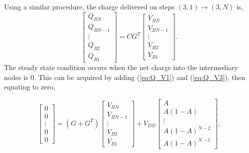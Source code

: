 \documentclass[conference]{IEEEtran}
\begin{document}
	Using a similar procedure, the charge delivered on steps $(3,1)\rightarrow(3,N)$ is,
	\begin{equation}
	\begin{bmatrix}
	Q_{BN} \\
	Q_{BN-1} \\
	\vdots\\
	Q_{B2} \\ 
	Q_{B1}
	\end{bmatrix}
	=
	C G^T
	\begin{bmatrix}
	V_{BN} \\
	V_{BN-1} \\
	\vdots \\
	V_{B2} \\
	V_{B1}
	\end{bmatrix}.
	\label{eq:Q_V3}
	\end{equation}
	The steady state condition occurs when the net charge into the intermediary nodes is 0. This can be acquired by adding (\ref{eq:Q_V1}) and (\ref{eq:Q_V3}), then equating to zero,
	
	\begin{equation}
		\begin{bmatrix}
			0 \\
			0 \\
			\vdots\\
			0 \\ 
			0
		\end{bmatrix}\!
		=
		\!(G\!+\!G^T)\!
		\begin{bmatrix}
			V_{BN} \\
			V_{BN-1} \\
			\vdots \\
			V_{B2} \\
			V_{B1}
		\end{bmatrix}\!
		+ \!V_{DD}\!\begin{bmatrix}
		A \\
		A(1-A) \\
		\vdots \\
		A(1\!-\!A)^{N-2} \\
		A(1\!-\!A)^{N-1}
	\end{bmatrix},	
	\end{equation}
	
\end{document}
